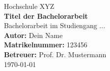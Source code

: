 \documentclass[a4paper,12pt,oneside]{scrreprt} %
\begin{document}
\begin{titlepage}
\centering
{\Large Hochschule XYZ \\[1cm]}
{\Huge \textbf{Titel der Bachelorarbeit}}\\[1cm]
{\large Bachelorarbeit im Studiengang ...}\\[2cm]
\textbf{Autor:} Dein Name\\
\textbf{Matrikelnummer:} 123456\\[0.5cm]
\textbf{Betreuer:} Prof. Dr. Mustermann\\[2cm]
\today
\end{titlepage}

\tableofcontents
\clearpage








\end{document}
